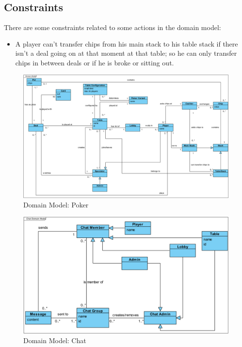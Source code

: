 \documentclass[a4paper,11pt]{report}
\begin{document}
\subsection{Constraints}
There are some constraints related to some actions in the domain model:
\begin{itemize}
\item A player can't transfer chips from his main stack to his table stack if there isn't a deal going on at that moment 
at that table; so he can only transfer chips in between deals or if he is broke or sitting out.
\end{itemize}
\begin{figure}
  \begin{center}
    \includegraphics[angle=90, scale=0.6]{img_domain_model_poker.png}
  \end{center}
  \caption{Domain Model: Poker}\label{fig:domain_poker}
\end{figure}
\begin{figure}
  \begin{center}
    \includegraphics[scale=0.5]{img_domain_model_chat.png}
  \end{center}
  \caption{Domain Model: Chat}\label{fig:domain_chat}
\end{figure}
\end{document}
